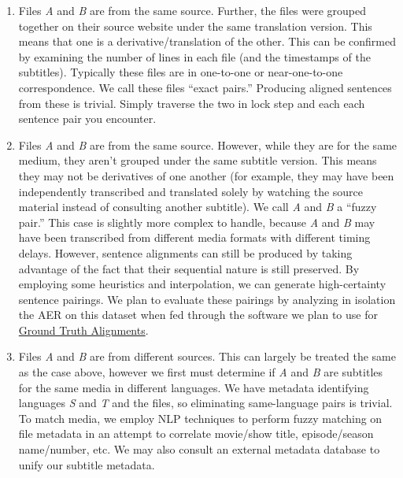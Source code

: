 \documentclass[twoside,twocolumn]{article}
\begin{document}
\begin{enumerate}

    \item Files \textit{A} and \textit{B} are from the same source. Further,
        the files were grouped together on their source website under the same
        translation version. This means that one is a derivative/translation
        of the other. This can be confirmed by examining the number of lines
        in each file (and the timestamps of the subtitles). Typically these
        files are in one-to-one or near-one-to-one correspondence. We call
        these files ``exact pairs.'' Producing aligned sentences from these is
        trivial. Simply traverse the two in lock step and each each sentence
        pair you encounter.

    \item Files \textit{A} and \textit{B} are from the same source. However,
        while they are for the same medium, they aren't grouped under the
        same subtitle version. This means they may not be derivatives of
        one another (for example, they may have been independently transcribed
        and translated solely by watching the source material instead of
        consulting another subtitle). We call \textit{A} and \textit{B} a 
        ``fuzzy pair.'' This case is slightly more complex to handle, because
        \textit{A} and \textit{B} may have been transcribed from different
        media formats with different timing delays. However, sentence
        alignments can still be produced by taking advantage of the fact that
        their sequential nature is still preserved. By employing some
        heuristics and interpolation, we can generate high-certainty sentence
        pairings. We plan to evaluate these pairings by analyzing in isolation
        the AER on this dataset when fed through the software we plan to use
        for \hyperref[subsec:ground-truth-alignments]{Ground Truth Alignments}.

    \item Files \textit{A} and \textit{B} are from different sources. This can
        largely be treated the same as the case above, however we first must
        determine if \textit{A} and \textit{B} are subtitles for the same media
        in different languages. We have metadata identifying languages
        \textit{S} and \textit{T} and the files, so eliminating same-language
        pairs is trivial. To match media, we employ NLP techniques to perform
        fuzzy matching on file metadata in an attempt to correlate movie/show
        title, episode/season name/number, etc. We may also consult an external
        metadata database to unify our subtitle metadata.

\end{enumerate}
\end{document}
